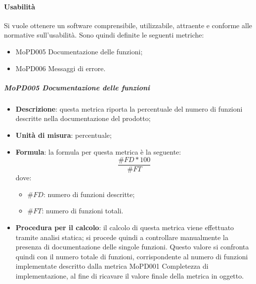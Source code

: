\documentclass[../norme-di-progetto.tex]{subfiles}
\begin{document}
\paragraph{Usabilità}
Si vuole ottenere un software comprensibile, utilizzabile, attraente e conforme alle normative sull'usabilità. Sono quindi definite le seguenti metriche:
\begin{itemize}
  \item MoPD005 Documentazione delle funzioni;
  \item MoPD006 Messaggi di errore.
\end{itemize}
\subparagraph{MoPD005 Documentazione delle funzioni}
\begin{itemize}
  \item \textbf{Descrizione}: questa metrica riporta la percentuale del numero di funzioni descritte nella documentazione del prodotto;
  \item \textbf{Unità di misura}: percentuale;
  \item \textbf{Formula}: la formula per questa metrica è la seguente:
  \begin{displaymath}
    \frac{\#FD * 100}{\#FT}
  \end{displaymath}
  dove:
  \begin{itemize}
    \item $ \#FD $: numero di funzioni descritte;
    \item $ \#FT $: numero di funzioni totali.
  \end{itemize}
  \item \textbf{Procedura per il calcolo}: il calcolo di questa metrica viene effettuato tramite analisi statica; si procede quindi a controllare manualmente la presenza di documentazione delle singole funzioni. Questo valore si confronta quindi con il numero totale di funzioni, corrispondente al numero di funzioni implementate descritto dalla metrica MoPD001 Completezza di implementazione, al fine di ricavare il valore finale della metrica in oggetto.
\end{itemize}
\end{document}
